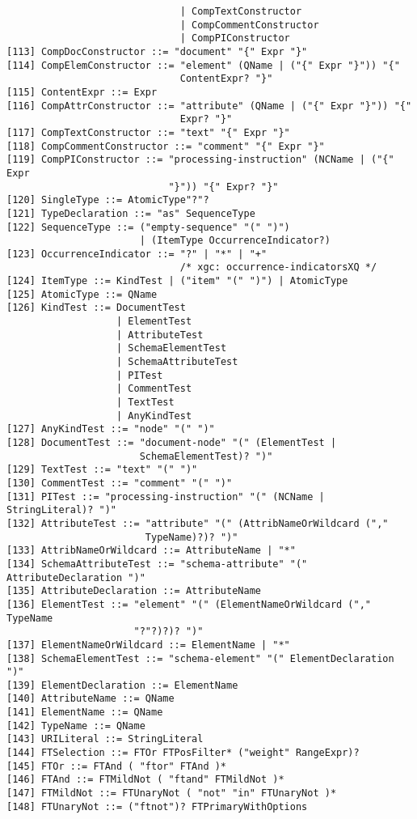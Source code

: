 \begin{verbatim}
                              | CompTextConstructor
                              | CompCommentConstructor
                              | CompPIConstructor
[113] CompDocConstructor ::= "document" "{" Expr "}"
[114] CompElemConstructor ::= "element" (QName | ("{" Expr "}")) "{"
                              ContentExpr? "}" 
[115] ContentExpr ::= Expr
[116] CompAttrConstructor ::= "attribute" (QName | ("{" Expr "}")) "{"
                              Expr? "}"  
[117] CompTextConstructor ::= "text" "{" Expr "}"
[118] CompCommentConstructor ::= "comment" "{" Expr "}"
[119] CompPIConstructor ::= "processing-instruction" (NCName | ("{" Expr
                            "}")) "{" Expr? "}" 
[120] SingleType ::= AtomicType"?"? 
[121] TypeDeclaration ::= "as" SequenceType
[122] SequenceType ::= ("empty-sequence" "(" ")")
                       | (ItemType OccurrenceIndicator?)
[123] OccurrenceIndicator ::= "?" | "*" | "+"	
                              /* xgc: occurrence-indicatorsXQ */
[124] ItemType ::= KindTest | ("item" "(" ")") | AtomicType
[125] AtomicType ::= QName
[126] KindTest ::= DocumentTest
                   | ElementTest
                   | AttributeTest
                   | SchemaElementTest
                   | SchemaAttributeTest
                   | PITest
                   | CommentTest
                   | TextTest
                   | AnyKindTest
[127] AnyKindTest ::= "node" "(" ")"
[128] DocumentTest ::= "document-node" "(" (ElementTest |
                       SchemaElementTest)? ")" 
[129] TextTest ::= "text" "(" ")"
[130] CommentTest ::= "comment" "(" ")"
[131] PITest ::= "processing-instruction" "(" (NCName | StringLiteral)? ")"
[132] AttributeTest ::= "attribute" "(" (AttribNameOrWildcard (","
                        TypeName)?)? ")"
[133] AttribNameOrWildcard ::= AttributeName | "*"
[134] SchemaAttributeTest ::= "schema-attribute" "(" AttributeDeclaration ")" 
[135] AttributeDeclaration ::= AttributeName
[136] ElementTest ::= "element" "(" (ElementNameOrWildcard ("," TypeName
                      "?"?)?)? ")" 
[137] ElementNameOrWildcard ::= ElementName | "*"
[138] SchemaElementTest ::= "schema-element" "(" ElementDeclaration ")"
[139] ElementDeclaration ::= ElementName
[140] AttributeName ::= QName
[141] ElementName ::= QName
[142] TypeName ::= QName
[143] URILiteral ::= StringLiteral
[144] FTSelection ::= FTOr FTPosFilter* ("weight" RangeExpr)?
[145] FTOr ::= FTAnd ( "ftor" FTAnd )*
[146] FTAnd ::= FTMildNot ( "ftand" FTMildNot )*
[147] FTMildNot ::= FTUnaryNot ( "not" "in" FTUnaryNot )*
[148] FTUnaryNot ::= ("ftnot")? FTPrimaryWithOptions

\end{verbatim}
